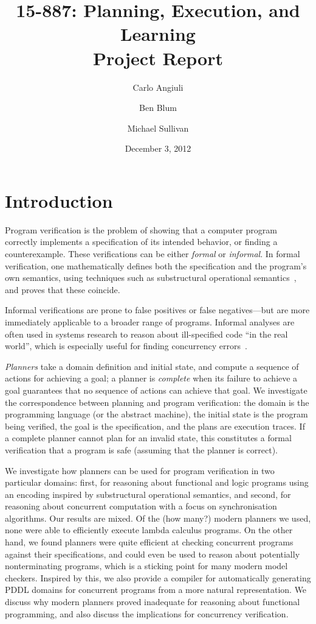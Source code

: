 \documentclass{article}
\title{
{\large 15-887: Planning, Execution, and Learning}\\
Project Report}
\author{Carlo Angiuli \and Ben Blum \and Michael Sullivan}
\date{December 3, 2012}
\begin{document}
\maketitle

\section{Introduction}

Program verification is the problem of showing that a computer program correctly
implements a specification of its intended behavior, or finding a
counterexample. These verifications can be either \emph{formal} or
\emph{informal}. In formal verification, one mathematically defines both the
specification and the program's own semantics, using techniques such as
substructural operational semantics~\cite{rob}, and proves that these coincide.

Informal verifications are prone to false positives or false negatives---but are
more immediately applicable to a broader range of programs. Informal analyses
are often used in systems research to reason about ill-specified code ``in the
real world'', which is especially useful for finding concurrency
errors~\cite{ben}.

{\em Planners} take a domain definition and initial state, and compute a
sequence of actions for achieving a goal; a planner is {\em complete} when its
failure to achieve a goal guarantees that no sequence of actions can achieve
that goal.
We investigate the correspondence between planning and program verification: the domain is the programming language (or the abstract machine), the initial state is the program being verified, the goal is the specification, and the plans are execution traces.
If a complete planner cannot plan for an invalid state, this constitutes a
formal verification that a program is safe (assuming that the planner is
correct).

We investigate how planners can be used for program verification in two particular domains:
first, for reasoning about functional and logic programs using an encoding
inspired by substructural operational semantics,
and second, for reasoning about concurrent computation with a focus on synchronisation algorithms.
Our results are mixed.
Of the (how many?) modern planners we used, none were able to efficiently execute lambda calculus programs. %
On the other hand, we found planners were quite efficient at checking concurrent programs against their specifications,
and could even be used to reason about potentially nonterminating programs, which is a sticking point for many modern model checkers. %
Inspired by this, we also provide a compiler for automatically generating PDDL
domains for concurrent programs from a more natural representation.
We discuss why modern planners proved inadequate for reasoning about functional programming, and also discuss the implications for concurrency verification.
\end{document}
